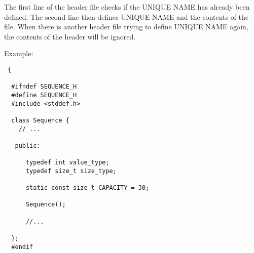 \documentclass[11pt,a4paper,english]{paper}
\begin{document}
\bigskip

\noindent The first line of the header file checks if the UNIQUE NAME has already been defined. The second line then defines UNIQUE NAME and the contents of the file. When there is another header file trying to define UNIQUE NAME again, the contents of the header will be ignored.
\bigskip

\begin{blackbox}{Example:}{

\begin{verbatim} {

  #ifndef SEQUENCE_H
  #define SEQUENCE_H
  #include <stddef.h>

  class Sequence {
    // ...

   public:

      typedef int value_type;
      typedef size_t size_type;

      static const size_t CAPACITY = 30;

      Sequence();

      //...

  };
  #endif

\end{verbatim}

    } 
  \end{blackbox}



  
\end{document}
